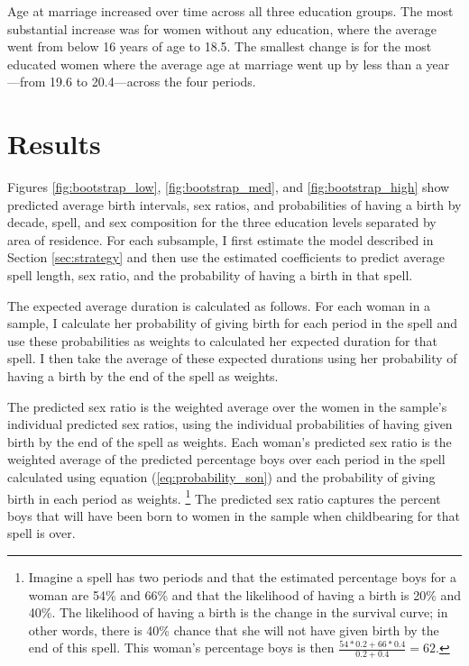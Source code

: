\documentclass[12pt,letterpaper]{article}
\begin{document}
Age at marriage increased over time across all three education groups.
The most substantial increase was for women without any education, where
the average went from below 16 years of age to 18.5.
The smallest change is for the most educated women where the average age
at marriage went up by less than a year---from 19.6 to 20.4---across the 
four periods.


\section{Results\label{sec:results}}


Figures \ref{fig:bootstrap_low}, \ref{fig:bootstrap_med}, and  \ref{fig:bootstrap_high} 
show predicted average birth intervals, sex ratios, and probabilities of having
a birth by decade, spell, and sex composition for the three education levels separated 
by area of residence.
For each subsample, I first estimate the model described in Section 
\ref{sec:strategy} and then use the estimated coefficients to predict 
average spell length, sex ratio, and the probability of having a birth in that spell.

The expected average duration is calculated as follows.
For each woman in a sample, I calculate her probability of giving birth for each period
in the spell and use these probabilities as weights to calculated her expected duration 
for that spell.
I then take the average of these expected durations using her probability of having a
birth by the end of the spell as weights.

The predicted sex ratio is the weighted average over the women in the sample's 
individual predicted sex ratios, using the individual probabilities of having
given birth by the end of the spell as weights.
Each woman's predicted sex ratio is the weighted average of the predicted
percentage boys over each period in the spell calculated using equation 
(\ref{eq:probability_son}) and the probability of giving birth in each period 
as weights.%
\footnote{
Imagine a spell has two periods and that the estimated percentage boys for a
woman are 54\% and 66\% and that the likelihood of having a birth is 20\% and 40\%.
The likelihood of having a birth is the change in the survival curve; 
in other words, there is 40\% chance that she will not have given birth by the end of 
this spell.
This woman's percentage boys is then $\frac{54*0.2+66*0.4}{0.2+0.4} = 62$.
}
The predicted sex ratio captures the percent boys that will have been born to women 
in the sample when childbearing for that spell is over.
\end{document}

